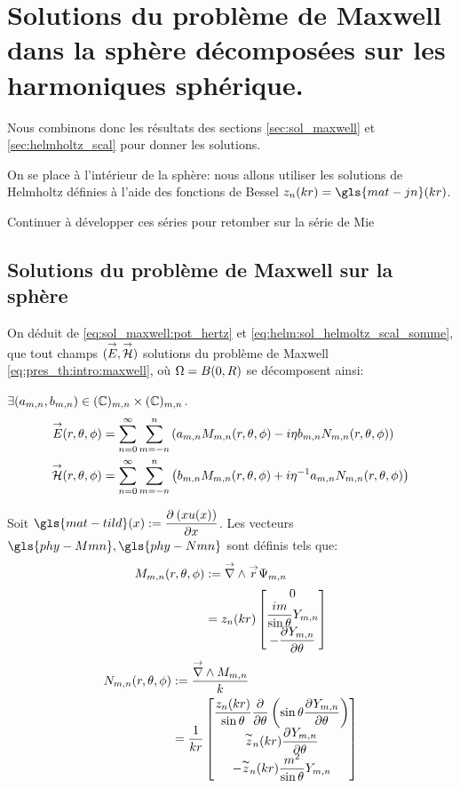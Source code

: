 \section{Solutions du problème de Maxwell dans la sphère décomposées sur les harmoniques sphérique.}\label{sec:maxwell_harmonique}

Nous combinons donc les résultats des sections \ref{sec:sol_maxwell} et \ref{sec:helmholtz_scal} pour donner les solutions.

On se place à l'intérieur de la sphère: nous allons utiliser les solutions de Helmholtz définies à l'aide des fonctions de Bessel \(z_n(kr) = \gls{mat-jn}(kr)\).


\begin{TODO}
  Continuer à développer ces séries pour retomber sur la série de Mie
\end{TODO}

\subsection{Solutions du problème de Maxwell sur la sphère}
On déduit de  \eqref{eq:sol_maxwell:pot_hertz} et \eqref{eq:helm:sol_helmoltz_scal_somme}, que tout champs \(({\overset{\rightarrow}{E}},{\overset{\rightarrow}{\mathcal{H}}})\) solutions du problème de Maxwell \eqref{eq:pres_th:intro:maxwell}, où \(\Omega = B(0,R)\) se décomposent ainsi:

\(\exists (a_{m,n},b_{m,n}) \in (\mathbb C)_{m,n}\times (\mathbb C)_{m,n}\).
\begin{align*}
  {\overset{\rightarrow}{E}}(r,\theta,\phi) &= \sum\limits_{n=0}^\infty\sum\limits_{m=-n}^n\left( a_{m,n}   M_{m,n}(r,\theta,\phi) - i \eta b_{m,n} N_{m,n}(r,\theta,\phi)\right)\\
  {\overset{\rightarrow}{\mathcal{H}}}(r,\theta,\phi) &= \sum\limits_{n=0}^\infty\sum\limits_{m=-n}^n\left( b_{m,n}   M_{m,n}(r,\theta,\phi) + i {\eta}^{-1} a_{m,n} N_{m,n}(r,\theta,\phi)\right)
\end{align*}

Soit \(\gls{mat-tild}(x) := \ddr{x}{\left(xu(x)\right)}\). Les vecteurs \(\gls{phy-Mmn} ,\gls{phy-Nmn}\) sont définis tels que:
\begin{align}
 \label{eq:defMmn}
  M_{m,n}(r,\theta,\phi) &:= {\overset{\rightarrow}{\nabla}}\wedge {\overset{\rightarrow}{r}} \Psi_{m,n} \\
  &= z_n(kr)
  \begin{bmatrix}
    0 \\ \dfrac{im}{\sin\theta}Y_{m,n}\\
    - \dfrac{\partial^{{}} Y_{m,n}}{{\partial \theta}^{{}}}
  \end{bmatrix}
\end{align}
\begin{align}
\label{eq:defNmn}
  N_{m,n}(r,\theta,\phi) &:= \dfrac{{\overset{\rightarrow}{\nabla}}\wedge M_{m,n}}{k} \\
  &= \dfrac{1}{kr}\begin{bmatrix}
    \dfrac{z_n(kr)}{\sin\theta}\dfrac{\partial^{{}} }{{\partial \theta}^{{}}}\left(\sin\theta\dfrac{\partial^{{}} Y_{m,n}}{{\partial \theta}^{{}}}\right)\\
    \overset{\thicksim}{z}_n(kr)\dfrac{\partial^{{}} Y_{m,n}}{{\partial \theta}^{{}}}\\
    -\overset{\thicksim}{z}_n(kr)\dfrac{m^2}{\sin\theta}Y_{m,n}\\
  \end{bmatrix}
\end{align}


